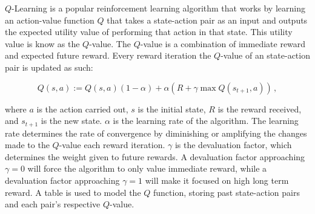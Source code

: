 $Q$-Learning \cite{watkins} is a popular reinforcement learning algorithm that works by learning an action-value function $Q$ that takes a state-action pair as an input and outputs the expected utility value of performing that action in that state. This utility value is know as the $Q$-value. The $Q$-value is a combination of immediate reward and expected future reward. Every reward iteration the $Q$-value of an state-action pair is updated as such:

\begin{equation}
	Q(s, a) := Q(s, a)(1 - \alpha) + \alpha(R + \gamma \max Q(s_{t+1}, a))
	\,,
	\label{equ::updateqlearn}
\end{equation}

\noindent
where $a$ is the action carried out, $s$ is the initial state, $R$ is the reward received, and $s_{t+1}$ is the new state. $\alpha$ is the learning rate of the algorithm. The learning rate determines the rate of convergence by diminishing or amplifying the changes made to the $Q$-value each reward iteration. $\gamma$ is the devaluation factor, which determines the weight given to future rewards. A devaluation factor approaching $\gamma=0$ will force the algorithm to only value immediate reward, while a devaluation factor approaching $\gamma=1$ will make it focused on high long term reward.  A table is used to model the $Q$ function, storing past state-action pairs and each pair's respective $Q$-value.
